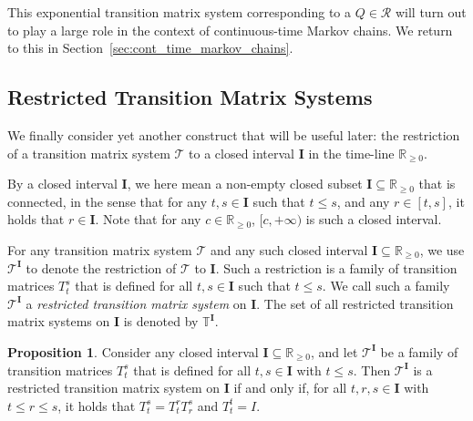 \documentclass[10pt,a4paper]{paper}
\theoremstyle{definition}
\newtheorem{proposition}[theorem]{Proposition}
\newcommand{\reals}{\mathbb{R}}
\newcommand{\realsnonneg}{\reals_{\geq 0}}
\newcommand{\coloneqq}{:\!=}
\begin{document}
This exponential transition matrix system corresponding to a $Q\in\mathcal{R}$ will turn out to play a large role in the context of continuous-time Markov chains. We return to this in Section~\ref{sec:cont_time_markov_chains}.

\subsection{Restricted Transition Matrix Systems}\label{sec:restricted}

We finally consider yet another construct that will be useful later: the restriction of a transition matrix system $\mathcal{T}$ to a closed interval $\mathbf{I}$ in the time-line $\realsnonneg$.

By a closed interval $\mathbf{I}$, we here mean a non-empty closed subset $\mathbf{I}\subseteq\realsnonneg$ that is connected, in the sense that for any $t,s\in\mathbf{I}$ such that $t\leq s$, and any $r\in[t,s]$, it holds that $r\in\mathbf{I}$. Note that for any $c\in\realsnonneg$, $[c,+\infty)$ is such a closed interval.

For any transition matrix system $\mathcal{T}$ and any such closed interval $\mathbf{I}\subseteq\realsnonneg$, we use $\mathcal{T}^\mathbf{I}$ to denote the restriction of $\mathcal{T}$ to $\mathbf{I}$. Such a restriction is a family of transition matrices $T_t^s$ that is defined for all $t,s\in\mathbf{I}$ such that $t\leq s$.
We call such a family $\mathcal{T}^{\mathbf{I}}$ a \emph{restricted transition matrix system} on $\mathbf{I}$. The set of all restricted transition matrix systems on $\mathbf{I}$ is denoted by $\mathbb{T}^{\mathbf{I}}$.


\begin{proposition}\label{prop:restr_trans_mat_system_if_semigroup}
Consider any closed interval $\mathbf{I}\subseteq\realsnonneg$, and let $\mathcal{T}^{\mathbf{I}}$ be a family of transition matrices $T_t^s$ that is defined for all $t,s\in\mathbf{I}$ with $t\leq s$. Then $\mathcal{T}^{\mathbf{I}}$ is a restricted transition matrix system on $\mathbf{I}$ if and only if, for all $t,r,s\in\mathbf{I}$ with $t\leq r\leq s$, it holds that $T_t^s = T_t^rT_r^s$ and $T_t^t=I$.
\end{proposition}
\end{document}
